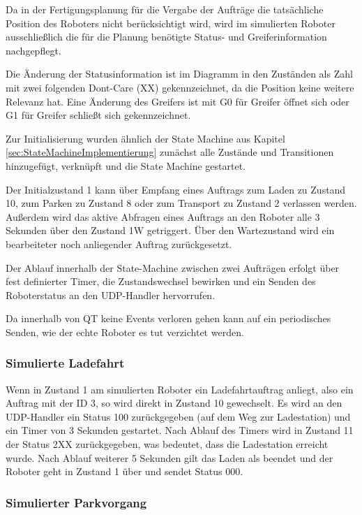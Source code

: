 Da in der Fertigungsplanung für die Vergabe der Aufträge die tatsächliche Position des Roboters nicht berücksichtigt wird, wird im simulierten Roboter ausschließlich die für die Planung benötigte Status- und Greiferinformation nachgepflegt. 

Die Änderung der Statusinformation ist im Diagramm in den Zuständen als Zahl mit zwei folgenden Dont-Care (XX) gekennzeichnet, da die Position keine weitere Relevanz hat. Eine Änderung des Greifers ist mit G0 für Greifer öffnet sich oder G1 für Greifer schließt sich gekennzeichnet.

Zur Initialisierung wurden ähnlich der State Machine aus Kapitel \ref{sec:StateMachineImplementierung} zunächst alle Zustände und Transitionen hinzugefügt, verknüpft und die State Machine gestartet. 

Der Initialzustand 1 kann über Empfang eines Auftrags zum Laden zu Zustand 10, zum Parken zu Zustand 8 oder zum Transport zu Zustand 2 verlassen werden. Außerdem wird das aktive Abfragen eines Auftrags an den Roboter alle 3 Sekunden über den Zustand 1W getriggert. Über den Wartezustand wird ein bearbeiteter noch anliegender Auftrag zurückgesetzt. 

Der Ablauf innerhalb der State-Machine zwischen zwei Aufträgen erfolgt über fest definierter Timer, die Zustandswechsel bewirken und ein Senden des Roboterstatus an den UDP-Handler hervorrufen.

Da innerhalb von QT keine Events verloren gehen kann auf ein periodisches Senden, wie der echte Roboter es tut verzichtet werden.

\subsubsection{Simulierte Ladefahrt}

Wenn in Zustand 1 am simulierten Roboter ein Ladefahrtauftrag anliegt, also ein Auftrag mit der ID 3, so wird direkt in Zustand 10 gewechselt. Es wird an den UDP-Handler ein Status 100 zurückgegeben  (auf dem Weg zur Ladestation) und ein Timer von 3 Sekunden gestartet. Nach Ablauf des Timers wird in Zustand 11 der Status 2XX zurückgegeben, was bedeutet, dass die Ladestation erreicht wurde. Nach Ablauf weiterer 5 Sekunden gilt das Laden als beendet und der Roboter geht in Zustand 1 über und sendet Status 000.

\subsubsection{Simulierter Parkvorgang}


